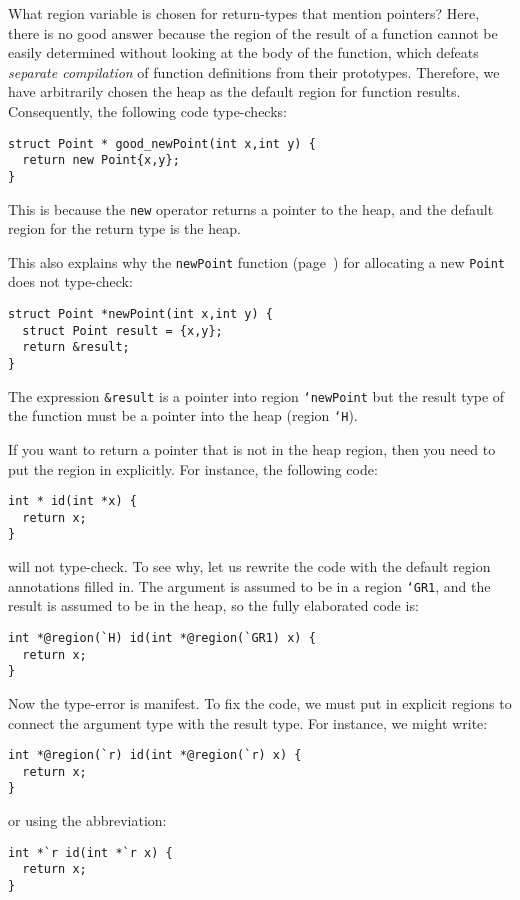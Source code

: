 What region variable is chosen for return-types that mention pointers?
Here, there is no good answer because 
the region of the result of a function cannot be easily determined
without looking at the body of the function, which defeats \emph{separate
compilation} of function definitions from their prototypes.  Therefore,
we have arbitrarily chosen the heap as the default region for
function results.  Consequently, the following code type-checks:
\begin{verbatim}
struct Point * good_newPoint(int x,int y) {
  return new Point{x,y};
}
\end{verbatim}
This is because the \texttt{new} operator returns a pointer
to the heap, and the default region for the return type is the heap.

This also explains why the \texttt{newPoint} function
(page~\pageref{sec:tut-regions}) for allocating a new
\texttt{Point} does not type-check:
\begin{verbatim}
struct Point *newPoint(int x,int y) {
  struct Point result = {x,y};
  return &result;
}
\end{verbatim}
The expression \texttt{\&result} is a pointer into region \texttt{`newPoint}
but the result type of the function must be a pointer into
the heap (region \texttt{`H}).  

If you want to return a pointer that is not in the heap region,
then you need to put the region in explicitly.  For instance,
the following code:
\begin{verbatim}
int * id(int *x) {
  return x;
}
\end{verbatim}
will not type-check.  To see why, let us rewrite the
code with the default region annotations filled in.  The argument
is assumed to be in a region \texttt{`GR1}, and the result is assumed to be
in the heap, so the fully elaborated code is:
\begin{verbatim}
int *@region(`H) id(int *@region(`GR1) x) {
  return x;
}
\end{verbatim}
Now the type-error is manifest.  To fix the code, we must put in
explicit regions to connect the argument type with the result type.
For instance, we might write:
\begin{verbatim}
int *@region(`r) id(int *@region(`r) x) {
  return x;
}
\end{verbatim}
or using the abbreviation:
\begin{verbatim}
int *`r id(int *`r x) {
  return x;
}
\end{verbatim}

